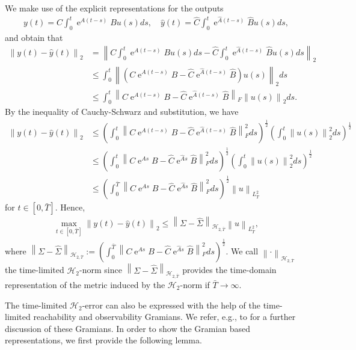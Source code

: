 \documentclass[a4paper,11pt, twoside]{article}
\newcommand{\expn}{\operatorname{e}}
\begin{document}
We make use of the explicit representations for the outputs \begin{align*}
 y(t)=C \int_0^t \expn^{A(t-s)} B u(s) ds, \quad \hat y(t)=\hat C \int_0^t  \expn^{\hat A(t-s)} \hat B u(s) ds,
\end{align*}
and obtain that {\allowdisplaybreaks \begin{align*}
\left\|y(t)- \hat y(t)\right\|_2 &=\left\|C \int_0^t \expn^{A(t-s)} B u(s) ds- \hat C \int_0^t  \expn^{\hat A(t-s)} \hat B u(s) 
ds\right\|_2\\&\leq \int_0^t \left\|\left(C \expn^{A(t-s)}  B - \hat C \expn^{\hat A(t-s)} \hat B\right) u(s)\right\|_2 ds\\&\leq \int_0^t \left\| 
C \expn^{A(t-s)} B - \hat C \expn^{\hat A(t-s)} \hat B\right\|_F \left\|u(s)\right\|_2 ds.
\end{align*}}
By the inequality of Cauchy-Schwarz and substitution, we have \begin{align*}
\left\|y(t)- \hat y(t)\right\|_2 &\leq \left(\int_0^t \left\|C \expn^{A(t-s)} B - \hat C \expn^{\hat A(t-s)} \hat B\right\|_F^2 
ds\right)^{\frac{1}{2}} \left(\int_0^t \left\|u(s)\right\|_2^2 ds\right)^{\frac{1}{2}}\\&\leq \left(\int_0^t \left\|C \expn^{As} B - \hat C 
\expn^{\hat As} \hat B\right\|_F^2 ds\right)^{\frac{1}{2}}  \left(\int_0^t \left\|u(s)\right\|_2^2 ds\right)^{\frac{1}{2}} \\&\leq \left(\int_0^{\bar 
T} \left\|C \expn^{As} B - \hat C \expn^{\hat A s} \hat B\right\|_F^2 ds\right)^{\frac{1}{2}}  \left\|u\right\|_{L^2_{\bar T}}
\end{align*}
for $t\in[0, \bar T]$. Hence, \begin{align}\label{relation_H2_output}
\max_{t\in [0, \bar T]}\left\|y(t)- \hat y(t)\right\|_2 \leq \left\|\Sigma-\hat\Sigma\right\|_{\mathcal H_{2, \bar T}}  \left\|u\right\|_{L_{\bar 
T}^2},
\end{align}
where $\left\|\Sigma-\hat\Sigma\right\|_{\mathcal H_{2, \bar T}}:=\left(\int_0^{\bar T} \left\|C \expn^{As} B - \hat C \expn^{\hat A s} \hat 
B\right\|_F^2 ds\right)^{\frac{1}{2}}$. We call $\left\|\cdot\right\|_{\mathcal H_{2, \bar T}}$ the time-limited $\mathcal H_2$-norm since  
$\left\|\Sigma-\hat\Sigma\right\|_{\mathcal H_{2, \bar T}}$ provides the time-domain representation of the metric induced by the $\mathcal H_2$-norm 
if $\bar T\rightarrow \infty$.\smallskip

The time-limited $\mathcal H_2$-error can also be expressed with the help of the time-limited reachability and observability Gramians. We refer, 
e.g., to \cite{morGawJ90} for a further discussion of these Gramians. In order to show the Gramian based representations, we first provide the 
following lemma.  
\end{document}
